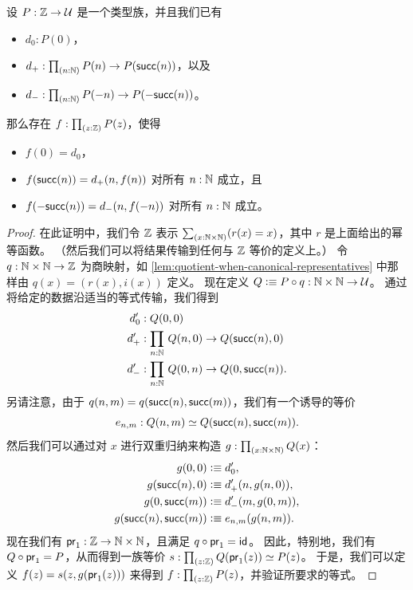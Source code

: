 \begin{lem}\label{thm:sign-induction}
  设 $P:\mathbb{Z}\to\mathcal{U}$ 是一个类型族，并且我们已有
  \begin{itemize}
  \item $d_0: P(0)$，
  \item $d_+: \prd{n:\N} P(n) \to P(\suc(n))$，以及
  \item $d_- : \prd{n:\N} P(-n) \to P(-\suc(n))$。
  \end{itemize}
  那么存在 $f:\prd{z:\Z} P(z)$，使得
  \begin{itemize}
    \item $f(0) = d_0$，
    \item $f(\mathsf{succ}(n)) = d_+(n,f(n))$ 对所有 $n:\mathbb{N}$ 成立，且
    \item $f(-\mathsf{succ}(n)) = d_-(n,f(-n))$ 对所有 $n:\mathbb{N}$ 成立。
  \end{itemize}
\end{lem}

\begin{proof}
  在此证明中，我们令 $\mathbb{Z}$ 表示 $\sm{x:\N\times\N}(r(x)=x)$，其中 $r$ 是上面给出的幂等函数。
  （然后我们可以将结果传输到任何与 $\mathbb{Z}$ 等价的定义上。）
  令 $q:\mathbb{N}\times\mathbb{N}\to\mathbb{Z}$ 为商映射，如 \cref{lem:quotient-when-canonical-representatives} 中那样由 $q(x) = (r(x),i(x))$ 定义。
  现在定义 $Q\vcentcolon\equiv P\circ q:\mathbb{N}\times \mathbb{N} \to \mathcal{U}$。
  通过将给定的数据沿适当的等式传输，我们得到
  \begin{align*}
    d'_0 &: Q(0,0)\\
    d'_+ &: \prd{n:\N} Q(n,0) \to Q(\suc(n),0)\\
    d'_- &: \prd{n:\N} Q(0,n) \to Q(0,\suc(n)).
  \end{align*}
  另请注意，由于 $q(n,m) = q(\mathsf{succ}(n),\mathsf{succ}(m))$，我们有一个诱导的等价
  \[e_{n,m}:Q(n,m) \simeq Q(\mathsf{succ}(n),\mathsf{succ}(m)).\]
  然后我们可以通过对 $x$ 进行双重归纳来构造 $g:\prd{x:\N\times \N} Q(x)$：
  \begin{align*}
    g(0,0) &\vcentcolon\equiv d'_0,\\
    g(\mathsf{succ}(n),0) &\vcentcolon\equiv d'_+(n,g(n,0)),\\
    g(0,\mathsf{succ}(m)) &\vcentcolon\equiv d'_-(m,g(0,m)),\\
    g(\mathsf{succ}(n),\mathsf{succ}(m)) &\vcentcolon\equiv e_{n,m}(g(n,m)).
  \end{align*}
  现在我们有 $\mathsf{pr}_{1} : \mathbb{Z} \to \mathbb{N}\times\mathbb{N}$，且满足 $q\circ \mathsf{pr}_{1} = \mathsf{id}_{}$。
  因此，特别地，我们有 $Q\circ \mathsf{pr}_{1} = P$，从而得到一族等价 $s:\prd{z:\Z} \eqv{Q(\proj1(z))}{P(z)}$。
  于是，我们可以定义 $f(z) = s(z,g(\mathsf{pr}_{1}(z)))$ 来得到 $f:\prd{z:\Z} P(z)$，并验证所要求的等式。
\end{proof}

